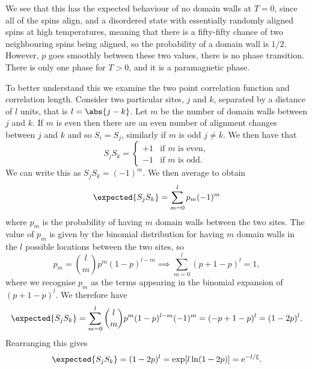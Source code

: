 \documentclass[fleqn]{NotesClass}
\newcommand*{\e}{\mathrm{e}}
\begin{document}
    We see that this has the expected behaviour of no domain walls at \(T = 0\), since all of the spins align, and a disordered state with essentially randomly aligned spins at high temperatures, meaning that there is a fifty-fifty chance of two neighbouring spins being aligned, so the probability of a domain wall is \(1/2\).
    However, \(p\) goes smoothly between these two values, there is no phase transition.
    There is only one phase for \(T > 0\), and it is a paramagnetic phase.
    
    To better understand this we examine the two point correlation function and correlation length.
    Consider two particular sites, \(j\) and \(k\), separated by a distance of \(l\) units, that is \(l = \abs{j - k}\).
    Let \(m\) be the number of domain walls between \(j\) and \(k\).
    If \(m\) is even then there are an even number of alignment changes between \(j\) and \(k\) and so \(S_i = S_j\), similarly if \(m\) is odd \(j \ne k\).
    We then have that
    \begin{equation}
        S_j S_k = 
        \begin{cases}
            +1 & \text{if } m \text{ is even},\\
            -1 & \text{if } m \text{ is odd}.
        \end{cases}
    \end{equation}
    We can write this as \(S_jS_k = (-1)^m\).
    We then average to obtain
    \begin{equation}
        \expected{S_jS_k} = \sum_{m=0}^{l} p_m(-1)^m
    \end{equation}
    where \(p_m\) is the probability of having \(m\) domain walls between the two sites.
    The value of \(p_m\) is given by the binomial distribution for having \(m\) domain walls in the \(l\) possible locations between the two sites, so
    \begin{equation}
        p_m = \binom{l}{m}p^m(1 - p)^{l - m} \implies \sum_{m = 0}^{l} (p + 1 - p)^l = 1,
    \end{equation}
    where we recognise \(p_m\) as the terms appearing in the binomial expansion of \((p + 1 - p)^l\).
    We therefore have
    \begin{equation}
        \expected{S_jS_k} = \sum_{m = 0}^{l} \binom{l}{m} p^m (1 - p)^{l - m} (-1)^m = (-p + 1 - p)^l = (1 - 2p)^l.
    \end{equation}
    Rearranging this gives
    \begin{equation}
        \expected{S_jS_k} = (1 - 2p)^l = \exp[l\ln(1 - 2p)] = \e^{-l/\xi}.
    \end{equation}
\end{document}

